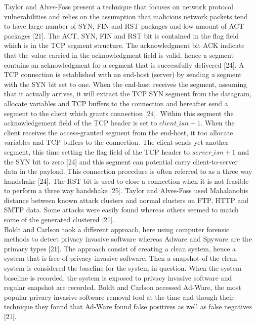 \documentclass[12pt]{article} %
\begin{document}
Taylor and Alves-Foss present a technique that focuses on network protocol vulnerabilities and relies on the assumption that malicious network packets tend to have large number of SYN, FIN and RST packages and low amount of ACT packages [21]. The ACT, SYN, FIN and RST bit is contained in the flag field which is in the TCP segment structure. The acknowledgment bit ACK indicate that the value carried in the acknowledgment field is valid, hence a segment contains an acknowledgment for a segment that is successfully delivered [24]. A TCP connection is established with an end-host (server) by sending a segment with the SYN bit set to one. When the end-host receives the segment, assuming that it actually arrives, it will extract the TCP SYN segment from the datagram, allocate variables and TCP buffers to the connection and hereafter send a segment to the client which grants connection [24].  Within this segment the acknowledgement field of the TCP header is set to $client\_isn+1$. When the client receives the access-granted segment from the end-host, it too allocate variables and TCP buffers to the connection. The client sends yet another segment, this time setting the flag field of the TCP header to $server\_isn+1$ and the SYN bit to zero [24] and this segment can potential carry client-to-server data in the payload. This connection procedure is often referred to as a three way handshake [24]. The RST bit is used  to close a connection when it is not feasible to perform a three way handshake [25]. Taylor and Alves-Foss used Mahalanobis distance between known attack clusters and normal clusters on FTP, HTTP and SMTP data. Some attacks were easily found whereas others seemed to match some of the generated clustered [21]. \\
Boldt and Carlson took a different approach, here using computer forensic methods to detect privacy invasive software whereas Adware and Spyware are the primary types [21]. The approach consist of creating a clean system, hence a system that is free of privacy invasive software. Then a snapshot of the clean system is considered the baseline for the system in question. When the system baseline is recorded, the system is exposed to privacy invasive software and regular snapshot are recorded. Boldt and Carlson accessed Ad-Ware, the most popular privacy invasive software removal tool at the time and though their technique they found that Ad-Ware found false positives as well as false negatives [21]. \\
\end{document}
